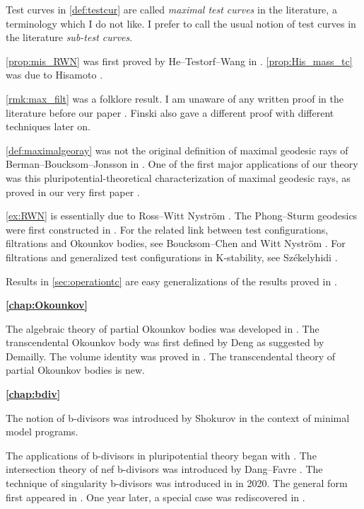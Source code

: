 Test curves in \cref{def:testcur} are called \emph{maximal test curves} in the literature, a terminology which I do not like. I prefer to call the usual notion of test curves in the literature \emph{sub-test curves}.

\cref{prop:mis_RWN} was first proved by He--Testorf--Wang in \cite{HTW23}. \cref{prop:His_mass_tc} was due to Hisamoto \cite{His16}.

\cref{rmk:max_filt} was a folklore result. I am unaware of any written proof in the literature before our paper \cite{DX22}. Finski \cite{Fin22b} also gave a different proof with different techniques later on.

\cref{def:maximalgeoray} was not the original definition of maximal geodesic rays of Berman--Boucksom--Jonsson in \cite{BBJ21}. One of the first major applications of our theory was this pluripotential-theoretical characterization of maximal geodesic rays, as proved in our very first paper \cite{DX22}.

\cref{ex:RWN} is essentially due to Ross--Witt Nystr\"om \cite{RWN14}. The Phong--Sturm geodesics were first constructed in \cite{PS07}. For the related link between test configurations, filtrations and Okounkov bodies, see Boucksom--Chen \cite{BC11} and Witt Nystr\"om \cite{WN12}. For filtrations and generalized test configurations in K-stability, see Sz\'ekelyhidi \cite{Sze15}.

Results in \cref{sec:operationtc} are easy generalizations of the results proved in \cite{Xia23Operations}.

\textbf{\cref{chap:Okounkov}}

The algebraic theory of partial Okounkov bodies was developed in \cite{Xia21}.
The transcendental Okounkov body was first defined by Deng \cite{Deng17} as suggested by Demailly. The volume identity was proved in \cite{DRWNXZ}. The transcendental theory of partial Okounkov bodies is new.

\textbf{\cref{chap:bdiv}}

The notion of b-divisors was introduced by Shokurov \cite{Sho93} in the context of minimal model programs.

The applications of b-divisors in pluripotential theory began with \cite{BFJ09}. The intersection theory of nef b-divisors was introduced by Dang--Favre \cite{DF20}. The technique of singularity b-divisors was introduced in \cite{XiaPPT} in 2020. The general form first appeared in \cite{Xia22}. One year later, a special case was rediscovered in \cite{BBGHdJ21}.

